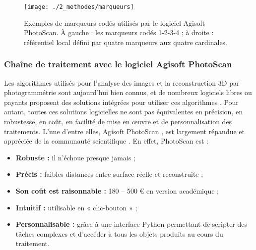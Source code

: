 \begin{figure}[H]
	\begin{center}
	\texttt{[image: ./2\_methodes/marqueurs]}
		\caption[Exemples de marqueurs codés utilisés par le logiciel Agisoft PhotoScan]{Exemples de marqueurs codés utilisés par le logiciel Agisoft PhotoScan. À gauche : les marqueurs codés 1-2-3-4 ; à droite : référentiel local défini par quatre marqueurs aux quatre cardinales.}
	\label{figure_methodo16}
\end{center}
\end{figure}

\subsubsection{Chaîne de traitement avec le logiciel Agisoft PhotoScan}

Les algorithmes utilisés pour l’analyse des images et la reconstruction 3D par photogrammétrie sont aujourd’hui bien connus, et de nombreux logiciels libres ou payants proposent des solutions intégrées pour utiliser ces algorithmes \citep{ioannides_benchmarking_2016}. Pour autant, toutes ces solutions logicielles ne sont pas équivalentes en précision, en robustesse, en coût, en facilité de mise en œuvre et de personnalisation des traitements. L’une d’entre elles, Agisoft PhotoScan \citep{agisoft_agisoft_2018-1}, est largement répandue et appréciée de la communauté scientifique \citep{figueira_accuracy_2015, lavy_quick_2015, burns_assessing_2016, guo_accuracy_2016, bryson_characterization_2017, casella_mapping_2017, mizuno_simple_2017, raczynski_accuracy_2017, raoult_how_2017, collin_very_2018, royer_photogrammetric_2018, ventura_mapping_2018}. En effet, PhotoScan est :

\begin{itemize}
    \item \textbf{Robuste :} il n’échoue presque jamais \citep{ioannides_benchmarking_2016} ;
    
    \item \textbf{Précis :} faibles distances entre surface réelle et reconstruite ;
    
    \item \textbf{Son coût est raisonnable :} 180 – 500 € en version académique ;
    
    \item \textbf{Intuitif :} utilisable en « clic-bouton » ;
    
    \item \textbf{Personnalisable :} grâce à une interface Python permettant de scripter des tâches complexes et d’accéder à tous les objets produits au cours du traitement.
\end{itemize}

